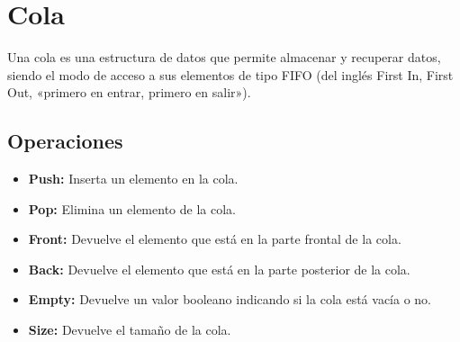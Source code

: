 \documentclass[../main.tex]{subfiles}
\begin{document}
\section{Cola} 
        
    Una cola es una estructura de datos que permite almacenar y recuperar datos, siendo el modo de acceso a sus elementos de tipo FIFO (del inglés First In, First Out, «primero en entrar, primero en salir»).

    \subsection{Operaciones}
        \begin{itemize}
            \item \textbf{Push:} Inserta un elemento en la cola.
            \item \textbf{Pop:} Elimina un elemento de la cola.
            \item \textbf{Front:} Devuelve el elemento que está en la parte frontal de la cola.
            \item \textbf{Back:} Devuelve el elemento que está en la parte posterior de la cola.
            \item \textbf{Empty:} Devuelve un valor booleano indicando si la cola está vacía o no.
            \item \textbf{Size:} Devuelve el tamaño de la cola.
        \end{itemize}

        
\end{document}
